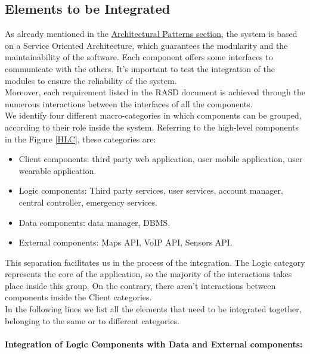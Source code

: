 \subsection{Elements to be Integrated}
As already mentioned in the \hyperlink{SOA_TG}{\underline{Architectural Patterns section}}, the system is based on a Service Oriented Architecture, which guarantees the modularity and the maintainability of the software. Each component offers some interfaces to communicate with the others.
It's important to test the integration of the modules to ensure the reliability of the system. \\
Moreover, each requirement listed in the RASD document is achieved through the numerous interactions between the interfaces of all the components.\\
We identify four different macro-categories in which components can be grouped, according to their role inside the system.
Referring to the high-level components in the Figure \underline{\ref{HLC}}, these categories are:
\begin{itemize}
    \item Client components: third party web application, user mobile application, user wearable application.
    \item Logic components: Third party services, user services, account manager, central controller, emergency services.
    \item Data components:  data manager, DBMS.
    \item External components: Maps API, VoIP API, Sensors API.
\end{itemize}
This separation facilitates us in the process of the integration. 
The Logic category represents the core of the application, so the majority of the interactions takes place inside this group.
On the contrary, there aren't interactions between components inside the Client categories.\\
In the following lines we list all the elements that need to be integrated together, belonging to the same or to different categories.\\ \\
\textbf{Integration of Logic Components with Data and External components:}
